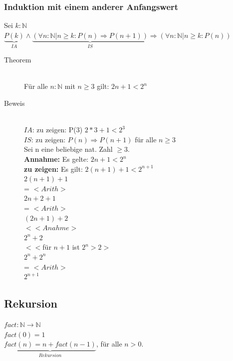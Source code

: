 \documentclass[a4paper,10pt]{article}
\newcommand{\NN}{\mathbb{N}} %
\newcommand{\Bold}[1]{\textbf{#1}} %
\begin{document}
\subsubsection{Induktion mit einem anderer Anfangswert}
Sei $k:\NN$ \\
$\underbrace{P(k)}_{IA} \wedge \underbrace{(\forall n:\NN|n \geq k : P(n) \Rightarrow P(n+1))}_{IS} \Rightarrow (\forall n : \NN | n \geq k : P(n))$
\begin{description}
	\item[Theorem] \hfill \\  F\"ur alle $n:\NN$ mit $n \geq 3$ gilt: $2n+1<2^n$
	\item[Beweis] \hfill \\
		$IA$: zu zeigen: P(3)  $2*3+1<2^3$ \\
		$IS$: zu zeigen: $P(n) \Rightarrow P(n+1)$ f\"ur alle $n \geq 3$ \\
		Sei n eine beliebige nat. Zahl $\geq 3$. \\
		\Bold {Annahme:} Es gelte: $2n+1 < 2^n$ \\
		\Bold {zu zeigen:} Es gilt: $2(n+1)+1 < 2^{n+1}$ \\
		$2(n+1)+1$ \\
		= $<Arith>$ \\
		$2n+2+1$ \\
		= $<Arith>$ \\
		$(2n+1)+2$ \\
		$< <Anahme>$ \\
		$2^n+2$ \\
		$< <$f\"ur $n+1$ ist $2^n>2>$ \\
		$2^n+2^n$ \\
		= $<Arith>$ \\
		$2^{n+1}$
\end{description}



\subsection{Rekursion}
$fact: \NN \rightarrow \NN$ \\
$fact(0) = 1$ \\
$\underbrace{fact(n) = n+fact(n-1)}_{Rekursion}$, f\"ur alle $n>0$.
\end{document}
